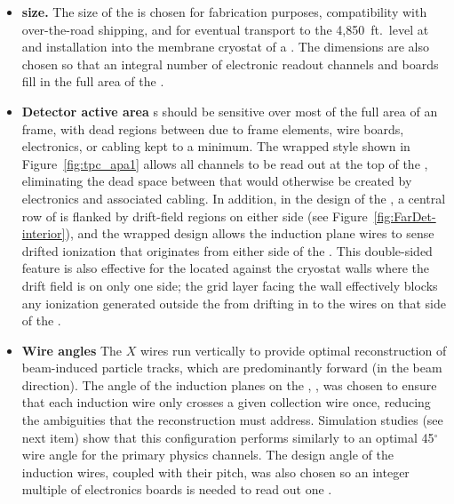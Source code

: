 


\begin{itemize}
\item \textbf{ size.} The size of the  is chosen for fabrication purposes, compatibility with over-the-road shipping, and for eventual transport to the 4,850~ft.~level at  and installation into the membrane cryostat of a . The dimensions are also chosen so that an integral number of electronic readout channels and boards fill in the full area of the .


\item \textbf{Detector active area} s should be sensitive over most of the full area of an  frame, with dead regions between  due to frame elements, wire boards, electronics, or cabling kept to a minimum.  The wrapped style shown in Figure~\ref{fig:tpc_apa1} allows all channels to be read out at the top of the , eliminating the dead space between  that would otherwise be created by electronics and associated cabling. In addition, in the design of the , a central row of  is flanked by drift-field regions on either side (see Figure~\ref{fig:FarDet-interior}), and the wrapped design allows the induction plane wires to sense drifted ionization that originates from either side of the .  This double-sided feature is also effective for the  located against the cryostat walls where the drift field is on only one side; the grid layer facing the wall effectively blocks any ionization generated outside the  from drifting in to the wires on that side of the .        

\item \textbf{Wire angles} The $X$ wires run vertically to provide optimal reconstruction of beam-induced particle tracks, which are predominantly forward (in the beam direction). The angle of the induction planes on the , \apainducwireangle, was chosen to ensure that each induction wire only crosses a given collection wire once, reducing the ambiguities that the reconstruction must address.  Simulation studies (see next item) show that this configuration performs similarly to an optimal 45$^\circ$ wire angle for the primary  physics channels.  The design angle of the induction wires, coupled with their pitch, was also chosen so an integer multiple of electronics boards is needed to read out one .


\end{itemize}

